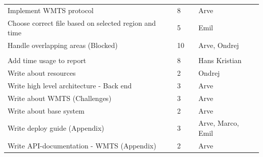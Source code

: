 \documentclass[11pt,a4paper,titlepage,oneside]{report}
\begin{document}
\begin{table}[h]
{\begin{tabular}{llll}
Implement WMTS protocol                                & 8                                                                   &                                                         & Arve                       \\
Choose correct file based on selected region and time  & 5                                                                   &                                                         & Emil                       \\
Handle overlapping areas (Blocked)                     & 10                                                                  &                                                         & Arve, Ondrej               \\
\rowcolor[HTML]{C0C0C0} 
\multicolumn{4}{l}{\cellcolor[HTML]{C0C0C0}\textbf{Reporting}}                                                                                                                                                      \\
Add time usage to report                               & 8                                                                   &                                                         & Hans Kristian              \\
Write about resources                                  & 2                                                                   &                                                         & Ondrej                     \\
Write high level architecture - Back end               & 3                                                                   &                                                         & Arve                       \\
Write about WMTS (Challenges)                          & 3                                                                   &                                                         & Arve                       \\
Write about base system                                & 2                                                                   &                                                         & Arve                       \\
Write deploy guide (Appendix)                          & 3                                                                   &                                                         & Arve, Marco, Emil          \\
Write API-documentation - WMTS (Appendix)              & 2                                                                   &                                                         & Arve                       \\

\end{tabular}}
\end{table}
\end{document}
